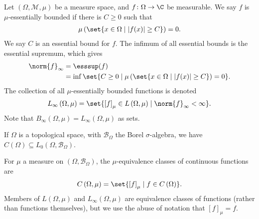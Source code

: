 \begin{definition}
  Let $\left(\Omega,\mathcal{M},\mu\right)$ be a measure space, and $f\colon \Omega\rightarrow \C$ be measurable. We say $f$ is $\mu$-essentially bounded if there is $C\geq 0$ such that
  \begin{align*}
    \mu\left(\set{x\in \Omega\mid \left\vert f(x) \right\vert\geq C}\right) = 0.
  \end{align*}
  We say $C$ is an essential bound for $f$. The infimum of all essential bounds is the essential supremum, which gives
  \begin{align*}
    \norm{f}_{\infty} &= \esssup(f)\\
                      &= \inf\set{C\geq 0 \mid \mu\left(\set{x\in \Omega\mid \left\vert f(x) \right\vert\geq C}\right) = 0}.
  \end{align*}
  The collection of all $\mu$-essentially bounded functions is denoted
  \begin{align*}
    L_{\infty}\left(\Omega,\mu\right) = \set{\left[f\right]_{\mu}\in L\left(\Omega,\mu\right)\mid \norm{f}_{\infty} < \infty}.
  \end{align*}
  Note that $B_{\infty}\left(\Omega,\mu\right) = L_{\infty}\left(\Omega,\mu\right)$ as sets.\newline

  If $\Omega$ is a topological space, with $\mathcal{B}_{\Omega}$ the Borel $\sigma$-algebra, we have $C\left(\Omega\right)\subseteq L_{0}\left(\Omega,\mathcal{B}_{\Omega}\right)$.\newline

  For $\mu$ a measure on $\left(\Omega,\mathcal{B}_{\Omega}\right)$, the $\mu$-equivalence classes of continuous functions are
  \begin{align*}
    C\left(\Omega,\mu\right) = \set{\left[f\right]_{\mu}\mid f\in C\left(\Omega\right)}.
  \end{align*}
  Members of $L\left(\Omega,\mu\right)$ and $L_{\infty}\left(\Omega,\mu\right)$ are equivalence classes of functions (rather than functions themselves), but we use the abuse of notation that $\left[f\right]_{\mu} = f$.
\end{definition}
